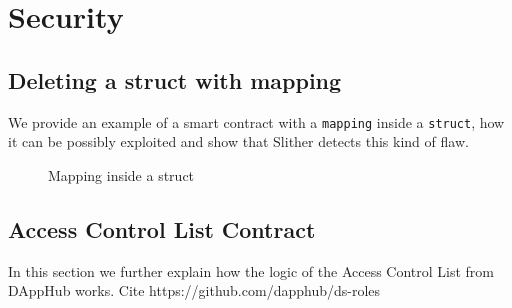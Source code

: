 \chapter{Security}

\section{Deleting a struct with mapping} \label{apx:security:mapping}

We provide an example of a smart contract with a \texttt{mapping} inside a \texttt{struct}, how it can be possibly exploited and show that Slither detects this kind of flaw. 

\begin{figure}[htb]
    \centering
    
    \caption{Mapping inside a struct}
    \label{fig:mapping-struct}
\end{figure}

\section{Access Control List Contract}

In this section we further explain how the logic of the Access Control List from DAppHub works. Cite  https://github.com/dapphub/ds-roles